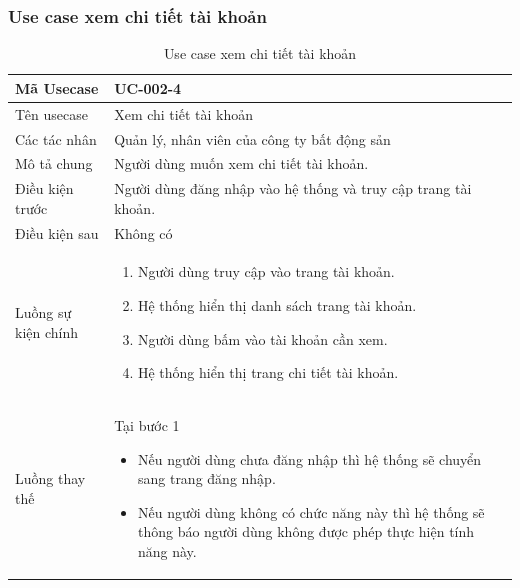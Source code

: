 \documentclass[12pt,a4paper]{article}
\begin{document}
    \subsubsection*{Use case xem chi tiết tài khoản }
    \begin{table}[H]
        \centering
        \begin{tabular}{|p{3.5cm}|p{11.5cm}|c|}
            \hline
            Mã Usecase      & UC-002-4                                                       \\
            \hline
            Tên usecase     & Xem chi tiết tài khoản                                         \\
            \hline
            Các tác nhân    & Quản lý, nhân viên của công ty bất động sản                    \\
            \hline
            Mô tả chung     & Người dùng muốn xem chi tiết tài khoản.                        \\
            \hline
            Điều kiện trước & Người dùng đăng nhập vào hệ thống và truy cập trang tài khoản. \\
            \hline
            Điều kiện sau   & Không có                                                       \\
            \hline
            Luồng sự kiện chính & \vspace{-.8cm}\begin{enumerate}
                                                    \item Người dùng truy cập vào trang tài khoản.
                                                    \item Hệ thống hiển thị danh sách trang tài khoản.
                                                    \item Người dùng bấm vào tài khoản cần xem.
                                                    \item Hệ thống hiển thị trang chi tiết tài khoản.
            \end{enumerate}
            \\
            \hline
            Luồng thay thế & Tại bước 1\newline
            \vspace{-.8cm}\begin{itemize}
                              \item Nếu người dùng chưa đăng nhập thì hệ thống sẽ chuyển sang trang đăng nhập.
                              \item  Nếu người dùng không có chức năng này thì hệ thống sẽ thông báo người dùng không được phép thực hiện tính năng này.
            \end{itemize}

            \\    \hline
        \end{tabular}
        \caption{Use case xem chi tiết tài khoản }
    \end{table}
\end{document}

